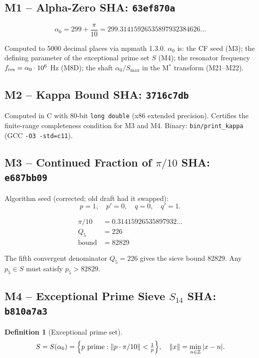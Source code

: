 \documentclass[12pt,letterpaper]{article}
\newtheorem{definition}[theorem]{Definition}
\begin{document}
\subsection{M1 -- Alpha-Zero \hfill SHA: \texttt{63ef870a}}

\begin{equation}
  \alpha_0 = 299 + \frac{\pi}{10}
  = 299.31415926535897932384626\ldots
  \label{eq:alpha0}
\end{equation}

Computed to 5000 decimal places via mpmath 1.3.0.
$\alpha_0$ is:
the CF seed (M3);
the defining parameter of the exceptional prime set $S$ (M4);
the resonator frequency $f_{\rm res} = \alpha_0 \cdot 10^6$ Hz (M8D);
the shaft $\alpha_0 / S_{\max}$ in the M$^*$ transform (M21--M22).

\subsection{M2 -- Kappa Bound \hfill SHA: \texttt{3716c7db}}

Computed in C with 80-bit \texttt{long double} (x86 extended precision).
Certifies the finite-range completeness condition for M3 and M4.
Binary: \texttt{bin/print\_kappa} (GCC \texttt{-O3 -std=c11}).

\subsection{M3 -- Continued Fraction of $\pi/10$ \hfill SHA: \texttt{e687bb09}}

Algorithm seed (corrected; old draft had it swapped):
\[
  p = 1,\quad p' = 0,\quad q = 0,\quad q' = 1.
\]

\begin{align}
  \pi/10 &= 0.31415926535897932\ldots \\
  Q_5    &= 226  \label{eq:Q5}\\
  \text{bound} &= 82829  \label{eq:M3bound}
\end{align}

The fifth convergent denominator $Q_5 = 226$ gives the sieve bound $82829$.
Any $p_5 \in S$ must satisfy $p_5 > 82829$.

\subsection{M4 -- Exceptional Prime Sieve $S_{14}$ \hfill SHA: \texttt{b810a7a3}}

\begin{definition}[Exceptional prime set]
\[
  S = S(\alpha_0)
  = \Bigl\{p \text{ prime} : \|p \cdot \pi/10\| < \tfrac{1}{p}\Bigr\},
  \quad \|x\| = \min_{n \in \mathbb{Z}} |x - n|.
\]
\end{definition}
\end{document}
